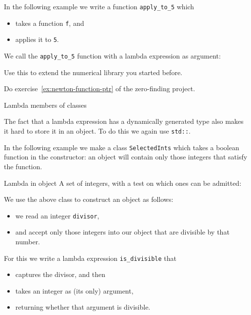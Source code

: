 In the following example we write a function \lstinline{apply_to_5}
which 
\begin{itemize}
\item takes a function \lstinline{f}, and
\item applies it to \lstinline{5}.
\end{itemize}
We call the \lstinline{apply_to_5} function
with a lambda expression as argument:


Use this to extend the numerical library you started before.

\begin{exercise}
  Do exercise~\ref{ex:newton-function-ptr} of the zero-finding project.
\end{exercise}

 {Lambda members of classes}

The fact that a lambda expression has a dynamically generated type
also makes it hard to store it in an object.
To do this we again use \lstinline{std::}.

In the following example we make a class \lstinline{SelectedInts}
which takes a boolean function in the constructor:
an object will contain only those integers that satisfy the function.

\begin{block}{Lambda in object}
  \label{sl:lambda-class}
  A set of integers, with a test on which ones can be admitted:
  \begin{multicols}{2}
  \end{multicols}
\end{block}

We use the above class to construct an object as follows:
\begin{itemize}
\item we read an integer \lstinline{divisor},
\item and accept only those integers into our object
  that are divisible by that number.
\end{itemize}
For this we write a lambda expression \lstinline{is_divisible} that 
\begin{itemize}
\item captures the divisor, and then
\item takes an integer as (its only) argument,
\item returning whether that argument is divisible.
\end{itemize}

